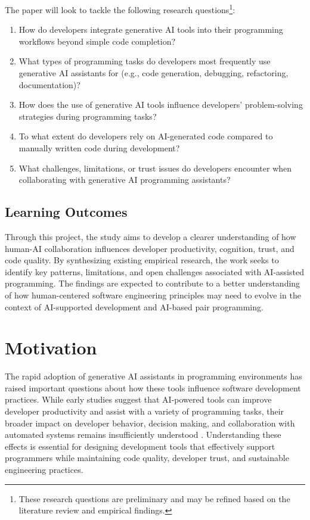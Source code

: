 The paper will look to tackle the following research questions\footnote{These research questions are preliminary and may be refined based on the literature review and empirical findings.}:
\begin{enumerate}[leftmargin=*, label=\textbf{RQ (\arabic*)}]
    \item How do developers integrate generative AI tools into their programming workflows beyond simple code completion?

    \item What types of programming tasks do developers most frequently use generative AI assistants for (e.g., code generation, debugging, refactoring, documentation)?

    \item How does the use of generative AI tools influence developers’ problem-solving strategies during programming tasks?

    \item To what extent do developers rely on AI-generated code compared to manually written code during development?

    \item What challenges, limitations, or trust issues do developers encounter when collaborating with generative AI programming assistants?

\end{enumerate}

\subsection{Learning Outcomes}
Through this project, the study aims to develop a clearer understanding of how human-AI collaboration influences developer productivity, cognition, trust, and code quality. By synthesizing existing empirical research, the work seeks to identify key patterns, limitations, and open challenges associated with AI-assisted programming. The findings are expected to contribute to a better understanding of how human-centered software engineering principles may need to evolve in the context of AI-supported development and AI-based pair programming.

\section{Motivation}
The rapid adoption of generative AI assistants in programming environments has raised important questions about how these tools influence software development practices. While early studies suggest that AI-powered tools can improve developer productivity and assist with a variety of programming tasks, their broader impact on developer behavior, decision making, and collaboration with automated systems remains insufficiently understood \cite{peng2023copilot,bird2023copilot}. Understanding these effects is essential for designing development tools that effectively support programmers while maintaining code quality, developer trust, and sustainable engineering practices.


